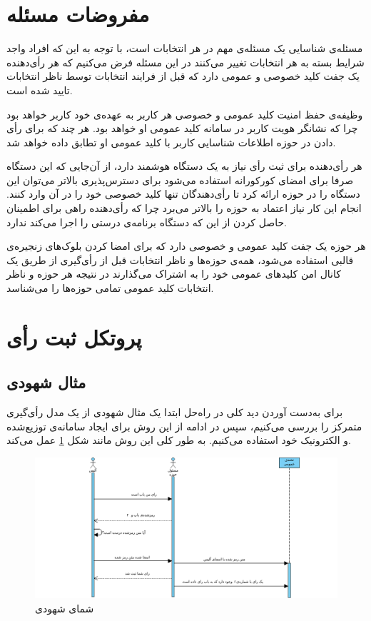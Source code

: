 \section{مفروضات مسئله}
مسئله‌ی شناسایی یک مسئله‌ی مهم در هر انتخابات است، با توجه به این که افراد واجد شرایط بسته به هر انتخابات تغییر می‌کنند در این مسئله فرض می‌کنیم که هر رأی‌دهنده یک جفت کلید خصوصی و عمومی دارد که قبل از فرایند انتخابات توسط ناظر انتخابات تایید شده است. 
\par
وظیفه‌ی حفظ امنیت کلید عمومی و خصوصی هر کاربر به عهده‌ی خود کاربر خواهد بود چرا که نشانگر هویت کاربر در سامانه‌ کلید عمومی او خواهد بود. هر چند که برای رأی دادن در حوزه اطلاعات شناسایی کاربر با کلید عمومی او تطابق داده خواهد شد.
\par
هر رأی‌دهنده برای ثبت رأی نیاز به یک دستگاه هوشمند دارد، از آن‌جایی که این دستگاه صرفا برای امضای کورکورانه استفاده می‌شود برای دسترس‌پذیری بالاتر می‌توان این دستگاه را در حوزه ارائه کرد تا رأی‌دهندگان تنها کلید خصوصی خود را در آن وارد کنند.  انجام این کار نیاز اعتماد به حوزه را بالاتر می‌برد چرا که رأی‌دهنده راهی برای اطمینان حاصل کردن از این که دستگاه برنامه‌ی درستی را اجرا می‌کند ندارد.
\par 
هر حوزه یک جفت کلید عمومی و خصوصی دارد که برای امضا کردن بلوک‌های زنجیره‌ی قالبی استفاده می‌شود، همه‌ی حوزه‌ها و ناظر انتخابات قبل از رأی‌گیری از طریق یک کانال امن کلیدهای عمومی خود را به اشتراک می‌گذارند در نتیجه هر حوزه و ناظر انتخابات کلید عمومی تمامی حوزه‌ها را می‌شناسد.

\section{پروتکل ثبت رأی‌}
\subsection{مثال شهودی}
برای به‌دست آوردن دید کلی در راه‌حل ابتدا یک مثال شهودی از یک مدل رأی‌گیری متمرکز را بررسی می‌کنیم،‌ سپس در ادامه از این روش برای ایجاد سامانه‌ی توزیع‌شده و الکترونیک خود استفاده می‌کنیم. به طور کلی این روش مانند شکل \ref{fig:pen} عمل می‌کند.
\begin{figure}[h!]
	\centering
	\includegraphics[width=1\linewidth]{penandpaper.png}
	\caption {شمای شهودی}
	\label{fig:pen}
\end{figure}


